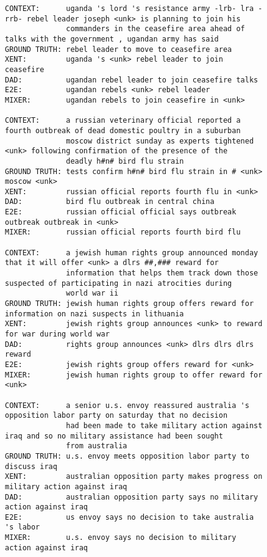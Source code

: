 \documentclass{article} \usepackage{iclr2016_conference,times}
\begin{document}
\begin{figure}[h!]
{\begin{verbatim}
CONTEXT:      uganda 's lord 's resistance army -lrb- lra -rrb- rebel leader joseph <unk> is planning to join his
              commanders in the ceasefire area ahead of talks with the government , ugandan army has said
GROUND TRUTH: rebel leader to move to ceasefire area         
XENT:         uganda 's <unk> rebel leader to join ceasefire
DAD:          ugandan rebel leader to join ceasefire talks
E2E:          ugandan rebels <unk> rebel leader
MIXER:        ugandan rebels to join ceasefire in <unk>

CONTEXT:      a russian veterinary official reported a fourth outbreak of dead domestic poultry in a suburban
              moscow district sunday as experts tightened <unk> following confirmation of the presence of the 
              deadly h#n# bird flu strain
GROUND TRUTH: tests confirm h#n# bird flu strain in # <unk> moscow <unk>
XENT:         russian official reports fourth flu in <unk>
DAD:          bird flu outbreak in central china
E2E:          russian official official says outbreak outbreak outbreak in <unk>
MIXER:        russian official reports fourth bird flu

CONTEXT:      a jewish human rights group announced monday that it will offer <unk> a dlrs ##,### reward for 
              information that helps them track down those suspected of participating in nazi atrocities during 
              world war ii
GROUND TRUTH: jewish human rights group offers reward for information on nazi suspects in lithuania
XENT:         jewish rights group announces <unk> to reward for war during world war
DAD:          rights group announces <unk> dlrs dlrs dlrs reward
E2E:          jewish rights group offers reward for <unk>
MIXER:        jewish human rights group to offer reward for <unk>

CONTEXT:      a senior u.s. envoy reassured australia 's opposition labor party on saturday that no decision 
              had been made to take military action against iraq and so no military assistance had been sought 
              from australia
GROUND TRUTH: u.s. envoy meets opposition labor party to discuss iraq
XENT:         australian opposition party makes progress on military action against iraq
DAD:          australian opposition party says no military action against iraq
E2E:          us envoy says no decision to take australia 's labor
MIXER:        u.s. envoy says no decision to military action against iraq


\end{verbatim}}
\end{figure}
\end{document}
